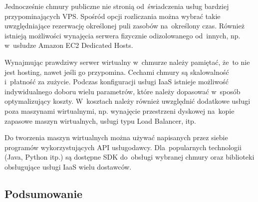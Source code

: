 \documentclass[12pt,a4paper,twoside,titlepage,openright]{book}
\begin{document}
Jednocześnie chmury publiczne nie stronią od~świadczenia usług bardziej przypominających VPS. Spośród opcji rozliczania można wybrać takie uwzględniające rezerwację określonej puli zasobów na~określony czas. Również istnieją możliwości wynajęcia serwera fizycznie odizolowanego od~innych, np. w~usłudze Amazon EC2 Dedicated Hosts.

Wynajmując prawdziwy serwer wirtualny w~chmurze należy pamiętać, że~to nie jest hosting, nawet jeśli go przypomina. Cechami chmury są skalowalność i~płatność za zużycie. Podczas konfiguracji usługi IaaS istnieje możliwość indywidualnego doboru wielu parametrów, które należy dopasować w~sposób optymalizujący koszty. W~kosztach należy również uwzględnić dodatkowe usługi poza maszynami wirtualnymi, np. wynajęcie przestrzeni dyskowej na~kopie zapasowe maszyn wirtualnych, usługi typu Load Balancer, itp.

Do tworzenia maszyn wirtualnych można używać napisanych przez siebie programów wykorzystujących API usługodawcy. Dla~popularnych technologii (Java, Python itp.) są dostępne SDK do~obsługi wybranej chmury oraz biblioteki obsługujące usługi IaaS wielu dostawców.

\subsection*{Podsumowanie}
\end{document}
